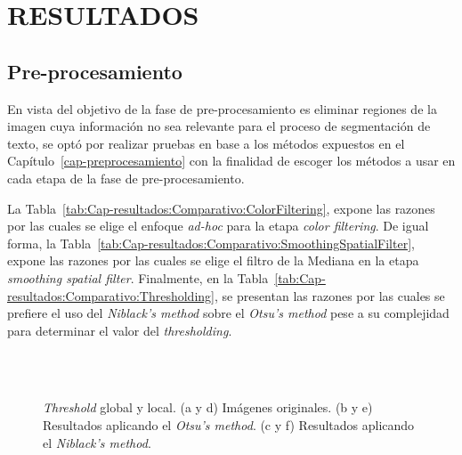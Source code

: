 \chapter{RESULTADOS}
\label{cap-resultados}

\section{Pre-procesamiento}
En vista del objetivo de la fase de pre-procesamiento es eliminar regiones de la
imagen cuya información no sea relevante para el proceso de segmentación de 
texto, se optó por realizar pruebas en base a los métodos expuestos en el 
Capítulo~\ref{cap-preprocesamiento} con la finalidad de escoger los métodos a 
usar en cada etapa de la fase de pre-procesamiento.

La Tabla~\ref{tab:Cap-resultados:Comparativo:ColorFiltering}, expone las razones
por las cuales se elige el enfoque \textit{ad-hoc} para la etapa \textit{color 
filtering}. De igual forma, la Tabla~\ref{tab:Cap-resultados:Comparativo:SmoothingSpatialFilter}, 
expone las razones por las cuales se elige el filtro de la Mediana en la etapa
\textit{smoothing spatial filter}. Finalmente, en la Tabla~\ref{tab:Cap-resultados:Comparativo:Thresholding}, 
se presentan las razones por las cuales se prefiere el uso del \textit{Niblack's
method} sobre el \textit{Otsu's method} pese a su complejidad para determinar el 
valor del \textit{thresholding}.

\begin{figure}[h!]
	\centering
   { }
   { }
   \\    

   { }
   { }
   \\
	\caption[\textit{Threshold} global y local.]{\textit{Threshold} global y 
	local. (a y d) Imágenes originales. (b y e) Resultados aplicando el
  \textit{Otsu's method}. (c y f) Resultados aplicando el \textit{Niblack's
  method}.}
	\label{Fig:Cap-resultados:threshold}
\end{figure}

